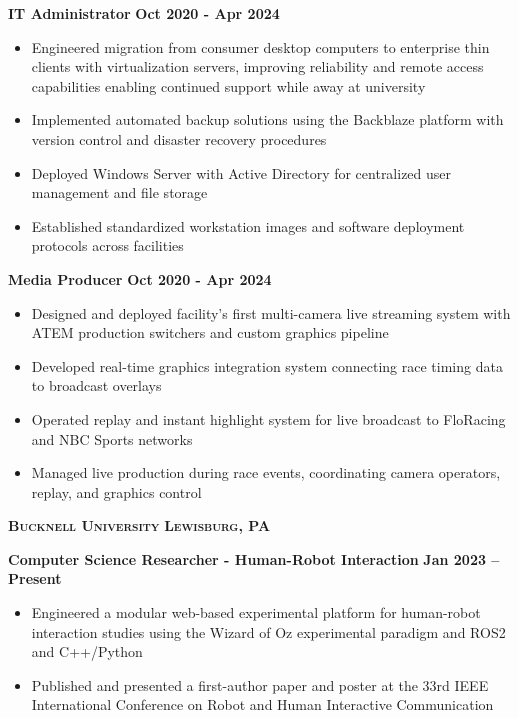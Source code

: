 \documentclass{article}
\newcommand{\textscbf}[1]{\textbf{\textsc{#1}}}
\begin{document}
\textbf{IT Administrator} \hfill \textbf{Oct 2020 - Apr 2024}
\begin{itemize}[noitemsep,topsep=2pt]
	\item Engineered migration from consumer desktop computers to enterprise thin clients with virtualization servers, improving reliability and remote access capabilities enabling continued support while away at university
	\item Implemented automated backup solutions using the Backblaze platform with version control and disaster recovery procedures
	\item Deployed Windows Server with Active Directory for centralized user management and file storage
	\item Established standardized workstation images and software deployment protocols across facilities
\end{itemize}

\textbf{Media Producer} \hfill \textbf{Oct 2020 - Apr 2024}
\begin{itemize}[noitemsep,topsep=2pt]
	\item Designed and deployed facility's first multi-camera live streaming system with ATEM production switchers and custom graphics pipeline
	\item Developed real-time graphics integration system connecting race timing data to broadcast overlays
	\item Operated replay and instant highlight system for live broadcast to FloRacing and NBC Sports networks
	\item Managed live production during race events, coordinating camera operators, replay, and graphics control\\
\end{itemize}


\textscbf{Bucknell University} \hfill \textscbf{Lewisburg, PA}

\textbf{Computer Science Researcher - Human-Robot Interaction} \hfill \textbf{Jan 2023 – Present}
\begin{itemize}[noitemsep,topsep=2pt]
    \item Engineered a modular web-based experimental platform for human-robot interaction studies using the Wizard of Oz experimental paradigm and ROS2 and C++/Python
    \item Published and presented a first-author paper and poster at the 33rd IEEE International Conference on Robot and Human Interactive Communication
\end{itemize}
\end{document}
